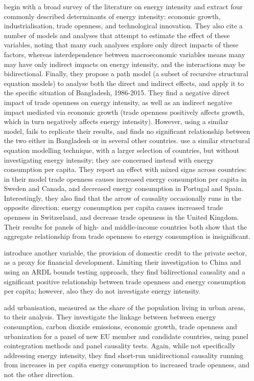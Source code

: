 \documentclass[12pt,a4paper]{article}
\begin{document}
\cite{panHowIndustrializationTrade2019} begin with a broad survey of the literature on energy intensity and extract four commonly described determinants of energy intensity: economic growth, industrialisation, trade openness, and technological innovation.
They also cite a number of models and analyses that attempt to estimate the effect of these variables, noting that many such analyses explore only direct impacts of these factors, whereas interdependence between macroeconomic variables means many may have only indirect impacts on energy intensity, and the interactions may be bidirectional.
Finally, they propose a path model (a subset of recursive structural equation models) to analyse both the direct and indirect effects, and apply it to the specific situation of Bangladesh, 1986-2015.
They find a negative direct impact of trade openness on energy intensity, as well as an indirect negative impact mediated via economic growth (trade openness positively affects growth, which in turn negatively affects energy intensity).
However, using a similar model, \cite{siardPathModelEnergy2020} fails to replicate their results, and finds no significant relationship between the two either in Bangladesh or in several other countries.
\cite{tibaIncomeTradeOpenness2018} use a similar structural equation modelling technique, with a larger selection of countries, but without investigating energy intensity; they are concerned instead with energy consumption per capita. 
They report an effect with mixed signs across countries: in their model trade openness causes increased energy consumption per capita in Sweden and Canada, and decreased energy consumption in Portugal and Spain.
Interestingly, they also find that the arrow of causality occasionally runs in the opposite direction: energy consumption per capita causes increased trade openness in Switzerland, and decrease trade openness in the United Kingdom.
Their results for panels of high- and middle-income countries both show that the aggregate relationship from trade openness to energy consumption is insignificant. 

\cite{shahbazDynamicLinksEnergy2013} introduce another variable, the provision of domestic credit to the private sector, as a proxy for financial development. Limiting their investigation to China and using an ARDL bounds testing approach, they find bidirectional causality and a significant positive relationship between trade openness and energy consumption per capita; however, also they do not investigate energy intensity.

\cite{kasmanCO2EmissionsEconomic2015} add urbanisation, measured as the share of the population living in urban areas, to their analysis.
They investigate the linkage between between energy consumption, carbon dioxide emissions, economic growth, trade openness and urbanization for a panel of new EU member and candidate countries, using panel cointegration methods and panel causality tests.
Again, while not specifically addressing energy intensity, they find short-run unidirectional
causality running from increases in per capita energy consumption to increased trade openness, and not the other direction.
\end{document}
